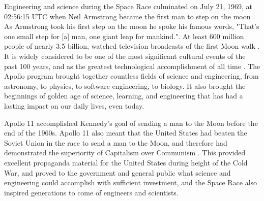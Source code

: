 \documentclass[10pt, journal]{IEEEtran}
\begin{document}
Engineering and science during the Space Race culminated on July 21, 1969, at 02:56:15 UTC when Neil Armstrong became the first man to step on the moon \cite{missionSummary} \cite{nasa11}. As Armstrong took his first step on the moon he spoke his famous words, "That's one small step for [a] man, one giant leap for mankind.". At least 600 million people of nearly 3.5 billion, watched television broadcasts of the first Moon walk \cite{moonFigures}. It is widely considered to be one of the most significant cultural events of the past 100 years, and as the greatest technological accomplishment of all time \cite{greatest}. The Apollo program brought together countless fields of science and engineering, from astronomy, to physics, to software engineering, to biology. It also brought the beginnings of golden age of science, learning, and engineering that has had a lasting impact on our daily lives, even today.

Apollo 11 accomplished Kennedy's goal \cite{kenspeech} of sending a man to the Moon before the end of the 1960s. Apollo 11 also meant that the United States had beaten the Soviet Union in the race to send a man to the Moon, and therefore had demonstrated the superiority of Capitalism over Communism \cite{economist}. This provided excellent propaganda material for the United States during height of the Cold War, and proved to the government and general public what science and engineering could accomplish with sufficient investment, and the Space Race also inspired generations to come of engineers and scientists. 
\end{document}
